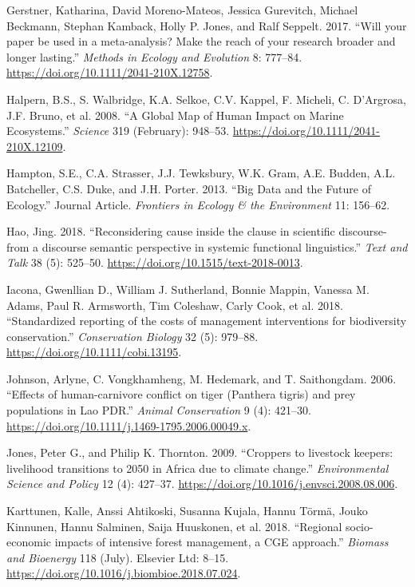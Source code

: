 \documentclass[fleqn,10pt]{wlpeerj} %
\begin{document}
\leavevmode\hypertarget{ref-Gerstner2017}{}%
Gerstner, Katharina, David Moreno-Mateos, Jessica Gurevitch, Michael
Beckmann, Stephan Kamback, Holly P. Jones, and Ralf Seppelt. 2017.
``Will your paper be used in a meta-analysis? Make the reach of your
research broader and longer lasting.'' \emph{Methods in Ecology and
Evolution} 8: 777--84. \url{https://doi.org/10.1111/2041-210X.12758}.

\leavevmode\hypertarget{ref-Halpern2008}{}%
Halpern, B.S., S. Walbridge, K.A. Selkoe, C.V. Kappel, F. Micheli, C.
D'Argrosa, J.F. Bruno, et al. 2008. ``A Global Map of Human Impact on
Marine Ecosystems.'' \emph{Science} 319 (February): 948--53.
\url{https://doi.org/10.1111/2041-210X.12109}.

\leavevmode\hypertarget{ref-Hampton2013}{}%
Hampton, S.E., C.A. Strasser, J.J. Tewksbury, W.K. Gram, A.E. Budden,
A.L. Batcheller, C.S. Duke, and J.H. Porter. 2013. ``Big Data and the
Future of Ecology.'' Journal Article. \emph{Frontiers in Ecology \& the
Environment} 11: 156--62.

\leavevmode\hypertarget{ref-Hao2018}{}%
Hao, Jing. 2018. ``Reconsidering cause inside the clause in scientific
discourse-from a discourse semantic perspective in systemic functional
linguistics.'' \emph{Text and Talk} 38 (5): 525--50.
\url{https://doi.org/10.1515/text-2018-0013}.

\leavevmode\hypertarget{ref-Iacona2018}{}%
Iacona, Gwenllian D., William J. Sutherland, Bonnie Mappin, Vanessa M.
Adams, Paul R. Armsworth, Tim Coleshaw, Carly Cook, et al. 2018.
``Standardized reporting of the costs of management interventions for
biodiversity conservation.'' \emph{Conservation Biology} 32 (5):
979--88. \url{https://doi.org/10.1111/cobi.13195}.

\leavevmode\hypertarget{ref-Johnson2006}{}%
Johnson, Arlyne, C. Vongkhamheng, M. Hedemark, and T. Saithongdam. 2006.
``Effects of human-carnivore conflict on tiger (Panthera tigris) and
prey populations in Lao PDR.'' \emph{Animal Conservation} 9 (4):
421--30. \url{https://doi.org/10.1111/j.1469-1795.2006.00049.x}.

\leavevmode\hypertarget{ref-Jones2009}{}%
Jones, Peter G., and Philip K. Thornton. 2009. ``Croppers to livestock
keepers: livelihood transitions to 2050 in Africa due to climate
change.'' \emph{Environmental Science and Policy} 12 (4): 427--37.
\url{https://doi.org/10.1016/j.envsci.2008.08.006}.

\leavevmode\hypertarget{ref-Karttunen2018}{}%
Karttunen, Kalle, Anssi Ahtikoski, Susanna Kujala, Hannu Törmä, Jouko
Kinnunen, Hannu Salminen, Saija Huuskonen, et al. 2018. ``Regional
socio-economic impacts of intensive forest management, a CGE approach.''
\emph{Biomass and Bioenergy} 118 (July). Elsevier Ltd: 8--15.
\url{https://doi.org/10.1016/j.biombioe.2018.07.024}.
\end{document}
